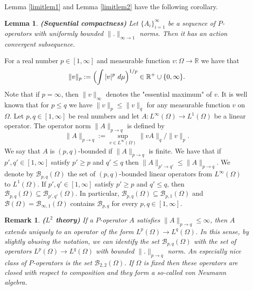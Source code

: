 \documentclass[a4wider]{amsart}
\newtheorem{lemma}[theorem]{Lemma}
\newtheorem{remarka}[theorem]{Remark}
\theoremstyle{definitionbreak}\newtheorem{D}[theorem]{Definition}
\theoremstyle{definitionbreak}\newtheorem*{D*}{Definition}
\begin{document}
Lemma \ref{limitlem1} and Lemma \ref{limitlem2} have the following corollary.

\begin{lemma} \label{lem:sc} {\bf (Sequential compactness)} Let $\{A_i\}_{i=1}^\infty$ be a sequence of $P$-ope\-rators with uniformly bounded $\|.\|_{\infty\to 1}$ norms. Then it has an action convergent subsequence.
\end{lemma}


For a real number $p\in [1,\infty]$ and measurable function $v:\Omega\to\mathbb{R}$ we have that $$\|v\|_p:=\Bigl(\int |v|^p~d\mu\Bigr)^{1/p}\in \mathbb{R}^+\cup\{0,\infty\}.$$ Note that if $p=\infty$, then $\|v\|_\infty$ denotes the "essential maximum" of $v$.
It is well known that for $p\leq q$ we have $\|v\|_p\leq\|v\|_q$ for any measurable function $v$ on $\Omega$.  
Let $p,q\in [1,\infty]$ be real numbers and let $A:L^\infty(\Omega)\to L^1(\Omega)$ be a linear operator. The operator norm $\|A\|_{p\to q}$ is defined by $$\|A\|_{p\to q}:=\sup_{v\in L^\infty(\Omega)}\|vA\|_q/\|v\|_p.$$ We say that $A$ is $(p,q)$-bounded if $\|A\|_{p\to q}$ is finite. We have that if $p',q'\in [1,\infty]$ satisfy $p'\geq p$ and $q'\leq q$ then $\|A\|_{p'\to q'}\leq \|A\|_{p\to q}$. We denote by $\mathcal{B}_{p,q}(\Omega)$ the set of $(p,q)$-bounded linear operators from $L^\infty(\Omega)$ to $L^1(\Omega)$.  If $p',q'\in [1,\infty]$ satisfy $p'\geq p$ and $q'\leq q$, then $\mathcal{B}_{p,q}(\Omega)\subseteq\mathcal{B}_{p',q'}(\Omega)$. In particular, $\mathcal{B}_{p,q}(\Omega)\subseteq\mathcal{B}_{p,1}(\Omega)$ and $\mathcal{B}(\Omega)=\mathcal{B}_{\infty,1}(\Omega)$ contains $\mathcal{B}_{p,q}$ for every $p,q\in [1,\infty]$. %

\begin{remarka} {\bf ($L^2$ theory)} If a $P$-operator $A$ satisfies $\|A\|_{p\to q}\leq\infty$, then $A$ extends uniquely to an operator of the form $L^p(\Omega)\to L^q(\Omega)$. In this sense, by slightly abusing the notation, we can identify the set $\mathcal{B}_{p,q}(\Omega)$ with the set of operators $L^p(\Omega)\to L^q(\Omega)$ with bounded $\|.\|_{p\to q}$ norm. An especially nice class of $P$-operators is the set $\mathcal{B}_{2,2}(\Omega)$. If $\Omega$ is fixed then these operators are closed with respect to composition and they form a so-called von Neumann algebra. 
\end{remarka}
\end{document}
